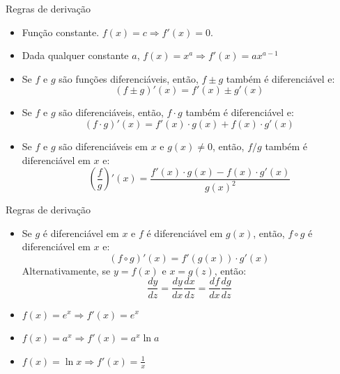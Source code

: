 \documentclass[10pt]{beamer}
\begin{document}
\begin{frame}
    {Regras de derivação}
    \begin{itemize}
        \item Função constante. $f(x) = c \Rightarrow f'(x) = 0$. \medskip
        \item Dada qualquer constante $a$, $f(x) = x^a \Rightarrow f'(x) = ax^{a-1}$\medskip
        \item Se $f$ e $g$ são funções diferenciáveis, então, $f \pm g$ também é diferenciável e:
        \[
          (f \pm g)'(x) = f'(x) \pm g'(x)  
        \]
        \item Se $f$ e $g$ são diferenciáveis, então, $f \cdot g$ também é diferenciável e:
        \[
          (f\cdot g)'(x) = f'(x)\cdot g(x) + f(x)\cdot g'(x)  
        \]
        \item Se $f$ e $g$ são diferenciáveis em $x$ e $g(x) \neq 0$, então, $f/g$ também é diferenciável em $x$ e:
        \[
          \left(\frac{f}{g}\right)'(x) = \frac{f'(x)\cdot g(x) - f(x)\cdot g'(x)}{g(x)^2} 
        \]
    \end{itemize}
\end{frame}

\begin{frame}
    {Regras de derivação}
    \begin{itemize}
        \item {} Se $g$ é diferenciável em $x$ e $f$ é diferenciável em $g(x)$, então, $f \circ g$ é diferenciável em $x$ e:
        \[
          (f \circ g)'(x) = f'(g(x))\cdot g'(x)  
        \]
        Alternativamente, se $y = f(x)$ e $x = g(z)$, então:
        \[
          \frac{dy}{dz} = \frac{d y}{d x} \frac{d x}{d z} = \frac{d f}{d x} \frac{d g}{d z}  
        \]
        \item $f(x) = e^x \Rightarrow f'(x) = e^x$ \medskip
        \item $f(x) = a^x \Rightarrow f'(x) = a^x \ln a$ \medskip
        \item $f(x) = \ln x \Rightarrow f'(x) = \frac{1}{x}$
    \end{itemize}
\end{frame}
\end{document}
